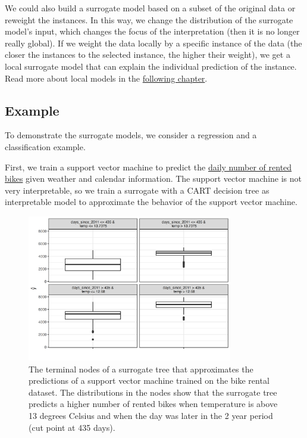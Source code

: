 \documentclass[
  11pt,
]{scrbook}
\begin{document}
We could also build a surrogate model based on a subset of the original data or reweight the instances.
In this way, we change the distribution of the surrogate model's input, which changes the focus of the interpretation (then it is no longer really global).
If we weight the data locally by a specific instance of the data (the closer the instances to the selected instance, the higher their weight), we get a local surrogate model that can explain the individual prediction of the instance.
Read more about local models in the \protect\hyperlink{lime}{following chapter}.

\hypertarget{example-3}{%
\subsection{Example}\label{example-3}}

To demonstrate the surrogate models, we consider a regression and a classification example.

First, we train a support vector machine to predict the \protect\hyperlink{bike-data}{daily number of rented bikes} given weather and calendar information.
The support vector machine is not very interpretable, so we train a surrogate with a CART decision tree as interpretable model to approximate the behavior of the support vector machine.

\begin{figure}

{\centering \includegraphics[width=0.8\textwidth]{images/surrogate-bike-1} 

}

\caption{The terminal nodes of a surrogate tree that approximates the predictions of a support vector machine trained on the bike rental dataset. The distributions in the nodes show that the surrogate tree predicts a higher number of rented bikes when temperature is above 13 degrees Celsius and when the day was later in the 2 year period (cut point at 435 days).}\label{fig:surrogate-bike}
\end{figure}
\end{document}
